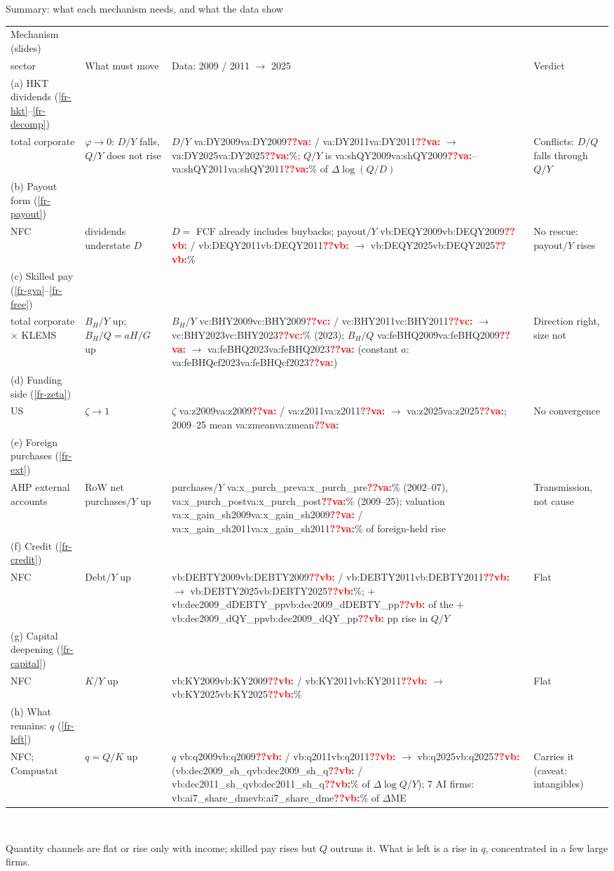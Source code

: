 \documentclass[aspectratio=169,10pt,t]{beamer}
\newcommand{\vget}[2]{\ifcsname #1:#2\endcsname\csname #1:#2\endcsname\else\textcolor{red}{\textbf{??#1:\detokenize{#2}}}\fi}
\newcommand{\va}[1]{\vget{va}{#1}}%
\newcommand{\vb}[1]{\vget{vb}{#1}}%
\newcommand{\vc}[1]{\vget{vc}{#1}}%
\newcommand{\secl}[1]{\\{\color{inksec}#1}}%
\begin{document}
\begin{frame}[label=fr-summary]{Summary: what each mechanism needs, and what the data show}
\vspace{0.05cm}
{\scriptsize\setlength{\tabcolsep}{4pt}\renewcommand{\arraystretch}{1.0}
\begin{tabular}{@{}>{\raggedright}p{2.95cm}>{\raggedright}p{2.2cm}>{\raggedright}p{5.4cm}>{\raggedright\arraybackslash}p{2.55cm}@{}}\toprule
Mechanism (slides)\secl{sector} & What must move & Data: 2009 / 2011 $\to$ 2025 & Verdict\\\midrule
(a) HKT dividends (\ref{fr-hkt}--\ref{fr-decomp})\secl{total corporate} & $\varphi\to0$: $D/Y$ falls, $Q/Y$ does not rise & $D/Y$ \va{DY2009} / \va{DY2011} $\to$ \va{DY2025}\%; $Q/Y$ is \va{shQY2009}--\va{shQY2011}\% of $\Delta\log(Q/D)$ & Conflicts: $D/Q$ falls through $Q/Y$\\\addlinespace[3.5pt]
(b) Payout form (\ref{fr-payout})\secl{NFC} & dividends understate $D$ & $D=$ FCF already includes buybacks; payout$/Y$ \vb{DEQY2009} / \vb{DEQY2011} $\to$ \vb{DEQY2025}\% & No rescue: payout$/Y$ rises\\\addlinespace[3.5pt]
(c) Skilled pay (\ref{fr-gva}--\ref{fr-free})\secl{total corporate $\times$ KLEMS} & $B_H/Y$ up; $B_H/Q=aH/G$ up & $B_H/Y$ \vc{BHY2009} / \vc{BHY2011} $\to$ \vc{BHY2023}\% (2023); $B_H/Q$ \va{feBHQ2009} $\to$ \va{feBHQ2023} (constant $a$: \va{feBHQcf2023}) & Direction right, size not\\\addlinespace[3.5pt]
(d) Funding side (\ref{fr-zeta})\secl{US} & $\zeta\to1$ & $\zeta$ \va{z2009} / \va{z2011} $\to$ \va{z2025}; 2009--25 mean \va{zmean} & No convergence\\\addlinespace[3.5pt]
(e) Foreign purchases (\ref{fr-ext})\secl{AHP external accounts} & RoW net purchases$/Y$ up & purchases$/Y$ \va{x_purch_pre}\% (2002--07), \va{x_purch_post}\% (2009--25); valuation \va{x_gain_sh2009} / \va{x_gain_sh2011}\% of foreign-held rise & Transmission, not cause\\\addlinespace[3.5pt]
(f) Credit (\ref{fr-credit})\secl{NFC} & Debt$/Y$ up & \vb{DEBTY2009} / \vb{DEBTY2011} $\to$ \vb{DEBTY2025}\%; $+$\vb{dec2009_dDEBTY_pp} of the $+$\vb{dec2009_dQY_pp} pp rise in $Q/Y$ & Flat\\\addlinespace[3.5pt]
(g) Capital deepening (\ref{fr-capital})\secl{NFC} & $K/Y$ up & \vb{KY2009} / \vb{KY2011} $\to$ \vb{KY2025}\% & Flat\\\addlinespace[3.5pt]
(h) What remains: $q$ (\ref{fr-left})\secl{NFC; Compustat} & $q=Q/K$ up & $q$ \vb{q2009} / \vb{q2011} $\to$ \vb{q2025} (\vb{dec2009_sh_q} / \vb{dec2011_sh_q}\% of $\Delta\log Q/Y$); 7 AI firms: \vb{ai7_share_dme}\% of $\Delta$ME & Carries it (caveat: intangibles)\\\bottomrule
\end{tabular}}\\[0.22cm]
{\footnotesize\textcolor{inksec}{Quantity channels are flat or rise only with income; skilled pay rises but $Q$ outruns it. What is left is a rise in $q$, concentrated in a few large firms.}\par}
\end{frame}
\end{document}
